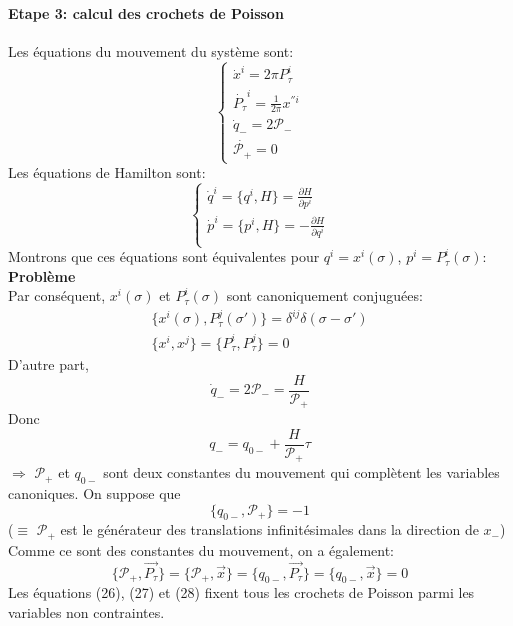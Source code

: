 \documentclass[a4paper,12pt]{article}
\def\CP{\mathcal{P}}
\def\pt{P_\tau}
\begin{document}
\paragraph*{Etape 3: calcul des crochets de Poisson}
Les équations du mouvement du système sont:
\begin{equation}
	\left\lbrace
    \begin{aligned}
   		\dot{x}^i=2\pi\pt^i\\
		\dot{\pt}^i=\frac{1}{2\pi}x^{'' i}\\
		\dot{q}_-=2\CP_-\\
		\dot{\CP_+}=0
     \end{aligned}
     \right.
\end{equation}
Les équations de Hamilton sont:
\begin{equation}
	\left\lbrace
    \begin{aligned}
		\dot{q}^i=\{q^i,H\}=\frac{\partial H}{\partial p^i}\\
		\dot{p}^i=\{p^i,H\}=-\frac{\partial H}{\partial q^i}\\
     \end{aligned}
     \right.
\end{equation}
 Montrons que ces équations sont équivalentes pour $q^i=x^i(\sigma)$, $p^i=\pt^i(\sigma)$:\\
\textbf{Problème}\\
Par conséquent, $x^i(\sigma)$ et $\pt^i(\sigma)$ sont canoniquement conjuguées:
\begin{equation}
	\begin{aligned}
	\{x^i(\sigma),\pt^j(\sigma')\}=\delta^{ij}\delta(\sigma-\sigma')\\
	\{x^i,x^j\}=\{\pt^i,\pt^j\}=0
	\end{aligned}
\end{equation}
D'autre part, $$\dot{q}_-=2\CP_-=\frac{H}{\CP_+}$$
Donc $$q_-=q_{0-}+\frac{H}{\CP_+}\tau$$
$\Rightarrow$ $\CP_+$ et $q_{0-}$ sont deux constantes du mouvement qui complètent les variables canoniques. On suppose que 
\begin{equation}
\{q_{0-},\CP_+\}=-1
\end{equation}
($\equiv$ $\CP_+$ est le générateur des translations infinitésimales dans la direction de $x_-$)
Comme ce sont des constantes du mouvement, on a également:
\begin{equation}
\{\CP_+,\vec{\pt}\}=\{\CP_+,\vec{x}\}=\{q_{0-},\vec{\pt}\}=\{q_{0-},\vec{x}\}=0
\end{equation}
Les équations (26), (27) et (28) fixent tous les crochets de Poisson parmi les variables non contraintes.
\end{document}
